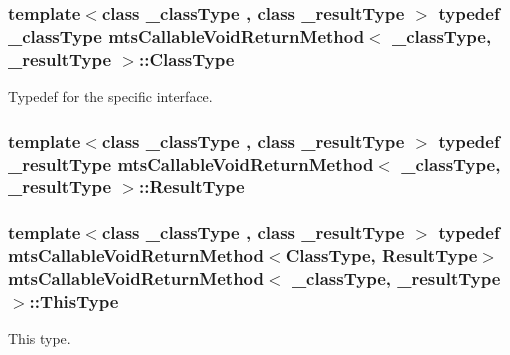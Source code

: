\hypertarget{classmts_callable_void_return_method_a2bea77e5dd239ec2a1d3558dd3ca1776}{
\subsubsection[{Class\-Type}]{\setlength{\rightskip}{0pt plus 5cm}template$<$class \-\_\-class\-Type , class \-\_\-result\-Type $>$ typedef \-\_\-class\-Type {\bf mts\-Callable\-Void\-Return\-Method}$<$ \-\_\-class\-Type, \-\_\-result\-Type $>$\-::{\bf Class\-Type}}}\label{classmts_callable_void_return_method_a2bea77e5dd239ec2a1d3558dd3ca1776}
Typedef for the specific interface. \hypertarget{classmts_callable_void_return_method_af01afd5ee66910d12e6fc9703a976260}{
\subsubsection[{Result\-Type}]{\setlength{\rightskip}{0pt plus 5cm}template$<$class \-\_\-class\-Type , class \-\_\-result\-Type $>$ typedef \-\_\-result\-Type {\bf mts\-Callable\-Void\-Return\-Method}$<$ \-\_\-class\-Type, \-\_\-result\-Type $>$\-::{\bf Result\-Type}}}\label{classmts_callable_void_return_method_af01afd5ee66910d12e6fc9703a976260}
\hypertarget{classmts_callable_void_return_method_a03bdd60bba7b2b001dd94270d8a27a5f}{
\subsubsection[{This\-Type}]{\setlength{\rightskip}{0pt plus 5cm}template$<$class \-\_\-class\-Type , class \-\_\-result\-Type $>$ typedef {\bf mts\-Callable\-Void\-Return\-Method}$<${\bf Class\-Type}, {\bf Result\-Type}$>$ {\bf mts\-Callable\-Void\-Return\-Method}$<$ \-\_\-class\-Type, \-\_\-result\-Type $>$\-::{\bf This\-Type}}}\label{classmts_callable_void_return_method_a03bdd60bba7b2b001dd94270d8a27a5f}
This type. 

